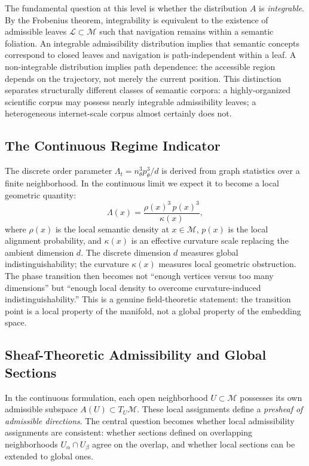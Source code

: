 \documentclass[12pt, a4paper]{article}
\theoremstyle{plain}
\theoremstyle{definition}
\begin{document}
The fundamental question at this level is whether the distribution $A$ is
\textit{integrable}. By the Frobenius theorem, integrability is equivalent
to the existence of admissible leaves $\mathcal{L} \subset \mathcal{M}$
such that navigation remains within a semantic foliation. An integrable
admissibility distribution implies that semantic concepts correspond to
closed leaves and navigation is path-independent within a leaf. A
non-integrable distribution implies path dependence: the accessible region
depends on the trajectory, not merely the current position. This distinction
separates structurally different classes of semantic corpora: a
highly-organized scientific corpus may possess nearly integrable
admissibility leaves; a heterogeneous internet-scale corpus almost certainly
does not.

\subsection{The Continuous Regime Indicator}

The discrete order parameter $\Lambda_t = n_\theta^3 p_\theta^3 / d$ is
derived from graph statistics over a finite neighborhood. In the continuous
limit we expect it to become a local geometric quantity:
\begin{equation}
  \Lambda(x) = \frac{\rho(x)^3\, p(x)^3}{\kappa(x)},
\end{equation}
where $\rho(x)$ is the local semantic density at $x \in \mathcal{M}$,
$p(x)$ is the local alignment probability, and $\kappa(x)$ is an effective
curvature scale replacing the ambient dimension $d$. The discrete dimension
$d$ measures global indistinguishability; the curvature $\kappa(x)$ measures
local geometric obstruction. The phase transition then becomes not ``enough
vertices versus too many dimensions'' but ``enough local density to overcome
curvature-induced indistinguishability.'' This is a genuine field-theoretic
statement: the transition point is a local property of the manifold, not a
global property of the embedding space.

\subsection{Sheaf-Theoretic Admissibility and Global Sections}

In the continuous formulation, each open neighborhood $U \subset
\mathcal{M}$ possesses its own admissible subspace $A(U) \subset T_U
\mathcal{M}$. These local assignments define a \textit{presheaf of
admissible directions}. The central question becomes whether local
admissibility assignments are consistent: whether sections defined on
overlapping neighborhoods $U_\alpha \cap U_\beta$ agree on the overlap,
and whether local sections can be extended to global ones.
\end{document}
